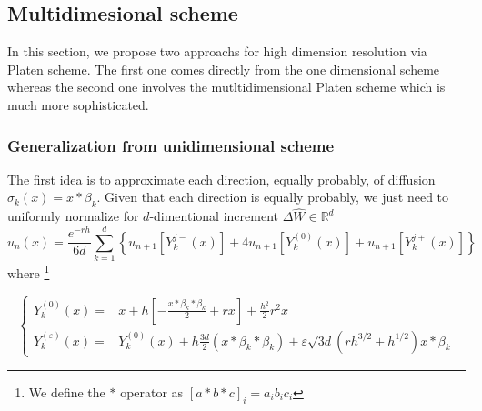 \documentclass[a4paper,10pt]{article}
\begin{document}
\subsection{Multidimesional scheme}
In this section, we propose two approachs for high dimension resolution via Platen scheme. The first one comes directly from the one dimensional scheme whereas the second one involves the mutltidimensional Platen scheme which is much more sophisticated.
\subsubsection{Generalization from unidimensional scheme}
The first idea is to approximate each direction, equally probably, of diffusion $\sigma_k(x)=x*\beta_k$. Given that each direction is equally probably, we just need to uniformly normalize for $d$-dimentional increment $\Delta \hat{W} \in \mathbb{R}^d$
\begin{equation}
u_n(x) = \frac{e^{-rh}}{6d}\sum^d_{k=1} \left\lbrace u_{n+1}[Y^{j-}_k(x)] +  4u_{n+1}[Y^{(0)}_k(x)]+ u_{n+1}[Y^{j+}_k(x)] \right\rbrace
\end{equation}
where \footnote{We define the $*$ operator as $[a*b*c]_i = a_ib_ic_i$}

\begin{equation}
\left\{
\begin{array}{ll}
Y^{(0)}_k(x)           =& x+h\left\lbrack-\frac{x*\beta_k*\beta_k}{2}+rx\right\rbrack + \frac{h^2}{2}r^2 x \\
Y^{(\varepsilon)}_k(x) =& Y^{(0)}_k(x)+h\frac{3d}{2}(x*\beta_k*\beta_k)+\varepsilon\sqrt{3d} \left( rh^{3/2}+h^{1/2} \right)x*\beta_k 
\end{array}
\right.
\end{equation}
\end{document}
